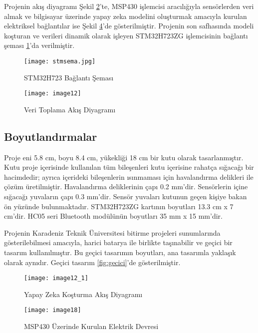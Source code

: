 Projenin akış diyagramı Şekil \ref{fig:akış}'te, MSP430 işlemcisi aracılığıyla sensörlerden veri almak ve bilgisayar üzerinde yapay zeka modelini oluşturmak amacıyla kurulan elektriksel bağlantılar  ise Şekil \ref{fig:elk_devre}'de gösterilmiştir. Projenin son safhasında modeli koşturan ve verileri dinamik olarak işleyen STM32H723ZG işlemcisinin bağlantı şeması \ref{fig:stmbaglanti}'da  verilmiştir.

\begin{figure}[H]
    \centering
    \texttt{[image: stmsema.jpg]}
    \caption{STM32H723 Bağlantı Şeması}
    \label{fig:stmbaglanti}
\end{figure}

\begin{figure}[H]
    \centering
    \texttt{[image: image12]}
    \caption{Veri Toplama Akış Diyagramı}
    \label{fig:akış}
\end{figure}


\subsection{Boyutlandırmalar}

Proje eni 5.8 cm, boyu 8.4 cm, yükekliği 18 cm bir kutu olarak tasarlanmıştır. Kutu proje içerisinde kullanılan tüm bileşenleri kutu içerisine rahatça sığacağı bir hacimdedir; ayrıca içerideki bileşenlerin ısınmaması için havalandırma delikleri ile çözüm üretilmiştir. Havalandırma deliklerinin çapı 0.2 mm'dir. Sensörlerin içine sığacağı yuvaların çapı 0.3 mm'dir. Sensör yuvaları kutunun geçen kişiye bakan ön yüzünde bulunmaktadır. STM32H723ZG kartının boyutları 13.3 cm x 7 cm'dir. HC05 seri Bluetooth modülünün boyutları 35 mm x 15 mm'dir. 

Projenin Karadeniz Teknik Üniversitesi bitirme projeleri sunumlarında gösterilebilmesi amacıyla, harici batarya ile birlikte taşınabilir ve geçici bir tasarım kullanılmıştır. Bu geçici tasarımın boyutları, ana tasarımla yaklaşık olarak aynıdır. Geçici tasarım  \ref{fig:gecici}'de gösterilmiştir.

\begin{figure}[H]
    \centering
    \texttt{[image: image12\_1]}
    \caption{Yapay Zeka Koşturma Akış Diyagramı}
    \label{fig:akış2}
\end{figure}

\begin{figure}[H]
    \centering
    \texttt{[image: image18]}
    \caption{MSP430 Üzerinde Kurulan Elektrik Devresi}
    \label{fig:elk_devre}
\end{figure}



